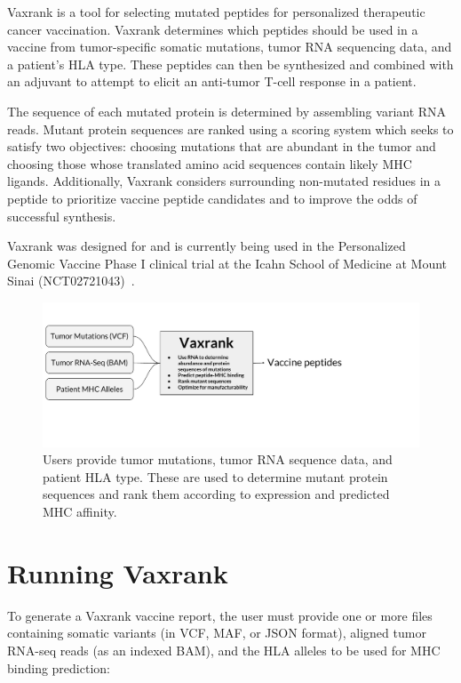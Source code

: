 \documentclass[10pt,letterpaper]{article}
\begin{document}
Vaxrank is a tool for selecting mutated peptides for personalized therapeutic cancer vaccination. Vaxrank determines which peptides should be used in a vaccine from tumor-specific somatic mutations, tumor RNA sequencing data, and a patient's HLA type. These peptides can then be synthesized and combined with an adjuvant to attempt to elicit an anti-tumor T-cell response in a patient.

The sequence of each mutated protein is determined by assembling variant RNA reads. Mutant protein sequences are ranked using a scoring system which seeks to satisfy two objectives: choosing mutations that are abundant in the tumor and choosing those whose translated amino acid sequences contain likely MHC ligands. Additionally, Vaxrank considers surrounding non-mutated residues in a peptide to prioritize vaccine peptide candidates and to improve the odds of successful synthesis.

Vaxrank was designed for and is currently being used in the Personalized Genomic Vaccine Phase I clinical trial at the Icahn School of Medicine at Mount Sinai (NCT02721043)~\citep{pgv-pipeline}.


\begin{figure}
    \includegraphics[scale=0.65, clip, trim=0 110 180 50]{vaxrank_diagram}
    \caption{Users provide tumor mutations, tumor RNA sequence data, and patient HLA type. These are used to determine mutant protein sequences and rank them according to expression and predicted MHC affinity.}
\end{figure}

\section{Running Vaxrank}
To generate a Vaxrank vaccine report, the user must provide one or more files containing somatic variants (in VCF, MAF, or JSON format), aligned tumor RNA-seq reads (as an indexed BAM), and the HLA alleles to be used for MHC binding prediction:
\end{document}
